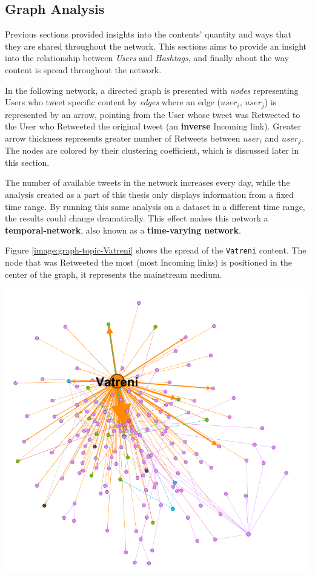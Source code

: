 \clearpage
\subsection{Graph Analysis}
\label{sec:results-graphs}

Previous sections provided insights into the contents' quantity and ways that they are shared throughout the network. This sections aims to provide an insight into the relationship between \textit{Users} and \textit{Hashtags}, and finally about the way content is spread throughout the network.

In the following network, a directed graph is presented with \textit{nodes} representing Users who tweet specific content by \textit{edges} where an edge (\(user_i\), \(user_j\)) is represented by an arrow, pointing from the User whose tweet was Retweeted to the User who Retweeted the original tweet (an \textbf{inverse} Incoming link). Greater arrow thickness represents greater number of Retweets between \(user_i\) and \(user_j\). The nodes are colored by their clustering coefficient, which is discussed later in this section.

The number of available tweets in the network increases every day, while the analysis created as a part of this thesis only displays information from a fixed time range. By running this same analysis on a dataset in a different time range, the results could change dramatically. This effect makes this network a \textbf{\gls{temporal-network}}, also known as a \textbf{time-varying network}.

Figure \ref{image:graph-topic-Vatreni} shows the spread of the \texttt{Vatreni} content. The node that was Retweeted the most (most Incoming links) is positioned in the center of the graph, it represents the mainstream medium.

\begin{center}
\includegraphics[width=16cm,keepaspectratio]{images/graph-topic-Vatreni.png}
\label{image:graph-topic-Vatreni}
\end{center}

